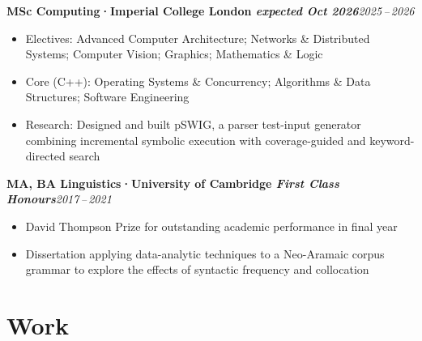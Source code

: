 \documentclass[10pt,a4paper]{article}
\newcommand{\entry}[3]{%
  \textbf{#2}\hfill{\small\textit{#1}}%
  \par\vspace{0pt}%
  #3%
}
\begin{document}
\begin{cvbox}
\entry{2025\,--\,2026}
  {MSc Computing\enspace\textcolor{accent}{·}\enspace Imperial College London \textnormal{\small\textit{expected Oct 2026}}}
  {\begin{itemize}
    \item Electives: Advanced Computer Architecture; Networks \& Distributed Systems; Computer Vision; Graphics; Mathematics \& Logic
    \item Core (C++): Operating Systems \& Concurrency; Algorithms \& Data Structures; Software Engineering
    \item Research: Designed and built pSWIG, a parser test-input generator combining incremental symbolic execution with coverage-guided and keyword-directed search
  \end{itemize}}
\end{cvbox}

\begin{cvbox}
\entry{2017\,--\,2021}
  {MA, BA Linguistics\enspace\textcolor{accent}{·}\enspace University of Cambridge \textnormal{\small\textit{First Class Honours}}}
  {\begin{itemize}
    \item David Thompson Prize for outstanding academic performance in final year
    \item Dissertation applying data-analytic techniques to a Neo-Aramaic corpus grammar to explore the effects of syntactic frequency and collocation
  \end{itemize}}
\end{cvbox}

\section{Work}
\end{document}

